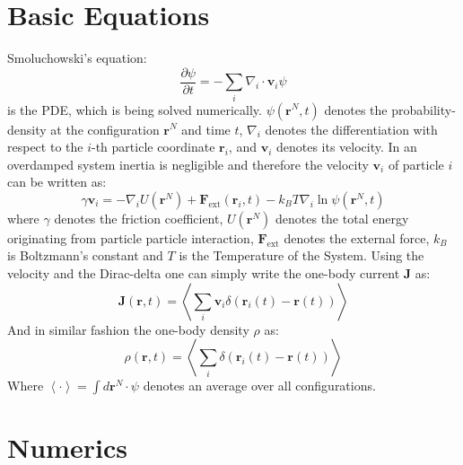 \documentclass[a4paper]{article}
\renewcommand\vec[1]{\mathbf{#1}}
\begin{document}
\section{Basic Equations}
Smoluchowski's equation:
\begin{equation}\label{eq:smol}
	\frac{\partial \psi}{\partial t} = - \sum_i \nabla_i \cdot \vec{v}_i \psi
\end{equation}
is the PDE, which is being solved numerically. $\psi \left( \vec{r}^N ,t \right)$ denotes the probability-density at the configuration $\vec{r}^N$ and time $t$,	$\nabla_i$ denotes the differentiation with respect to the $i$-th particle coordinate $\vec{r}_i$, and $\vec{v}_i$ denotes its velocity. 
In an overdamped system inertia is negligible and therefore the velocity $\vec{v}_i$ of particle $i$ can be written as:
\begin{equation}\label{eq:vel}
	\gamma \vec{v}_i = - \nabla_i U\left( \vec{r}^N \right) + \vec{F}_\text{ext} \left( \vec{r}_i ,t \right) - k_B T \nabla_i \ln \psi \left( \vec{r}^N ,t \right)
\end{equation}
where $\gamma$ denotes the friction coefficient, $U\left( \vec{r}^N \right)$ denotes the total energy originating from particle particle interaction, $\vec{F}_\text{ext}$ denotes the external force, $k_B$ is Boltzmann's constant and $T$ is the Temperature of the System.
Using the velocity and the Dirac-delta one can simply write the one-body current $\vec{J}$ as:
\begin{equation}
	\vec{J}\left( \vec{r}, t \right)=\left \langle \sum_i \vec{v}_i\delta\left( \vec{r}_i(t)-\vec{r}(t) \right) \right \rangle
	\label{eq:current}
\end{equation}
And in similar fashion the one-body density $\rho$ as:
\begin{equation}
	\rho\left( \vec{r}, t \right)=\left \langle \sum_i \delta\left( \vec{r}_i(t)-\vec{r}(t) \right) \right \rangle
	\label{eq:density}
\end{equation}
Where $\left\langle \cdot \right\rangle = \int d \vec{r}^N \cdot \psi $ denotes an average over all configurations.

\section{Numerics}
\end{document}
